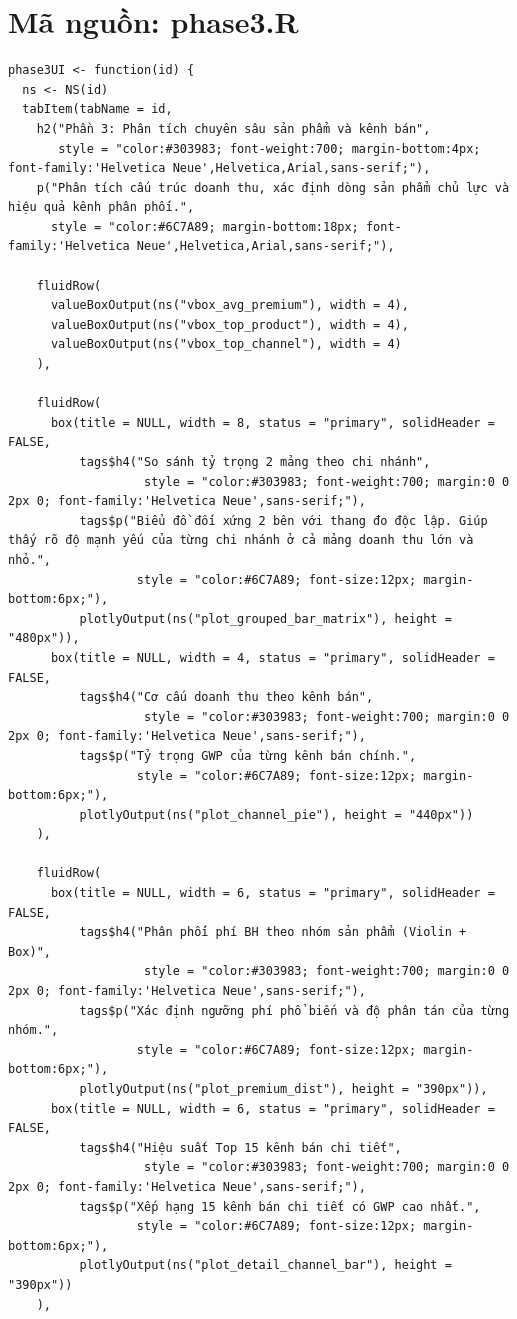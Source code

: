 \documentclass[12pt, a4paper]{article}
\begin{document}
\section{Mã nguồn: phase3.R}
\begin{lstlisting}
phase3UI <- function(id) {
  ns <- NS(id)
  tabItem(tabName = id,
    h2("Phần 3: Phân tích chuyên sâu sản phẩm và kênh bán",
       style = "color:#303983; font-weight:700; margin-bottom:4px; font-family:'Helvetica Neue',Helvetica,Arial,sans-serif;"),
    p("Phân tích cấu trúc doanh thu, xác định dòng sản phẩm chủ lực và hiệu quả kênh phân phối.",
      style = "color:#6C7A89; margin-bottom:18px; font-family:'Helvetica Neue',Helvetica,Arial,sans-serif;"),

    fluidRow(
      valueBoxOutput(ns("vbox_avg_premium"), width = 4),
      valueBoxOutput(ns("vbox_top_product"), width = 4),
      valueBoxOutput(ns("vbox_top_channel"), width = 4)
    ),

    fluidRow(
      box(title = NULL, width = 8, status = "primary", solidHeader = FALSE,
          tags$h4("So sánh tỷ trọng 2 mảng theo chi nhánh",
                   style = "color:#303983; font-weight:700; margin:0 0 2px 0; font-family:'Helvetica Neue',sans-serif;"),
          tags$p("Biểu đồ đối xứng 2 bên với thang đo độc lập. Giúp thấy rõ độ mạnh yếu của từng chi nhánh ở cả mảng doanh thu lớn và nhỏ.",
                  style = "color:#6C7A89; font-size:12px; margin-bottom:6px;"),
          plotlyOutput(ns("plot_grouped_bar_matrix"), height = "480px")),
      box(title = NULL, width = 4, status = "primary", solidHeader = FALSE,
          tags$h4("Cơ cấu doanh thu theo kênh bán",
                   style = "color:#303983; font-weight:700; margin:0 0 2px 0; font-family:'Helvetica Neue',sans-serif;"),
          tags$p("Tỷ trọng GWP của từng kênh bán chính.",
                  style = "color:#6C7A89; font-size:12px; margin-bottom:6px;"),
          plotlyOutput(ns("plot_channel_pie"), height = "440px"))
    ),

    fluidRow(
      box(title = NULL, width = 6, status = "primary", solidHeader = FALSE,
          tags$h4("Phân phối phí BH theo nhóm sản phẩm (Violin + Box)",
                   style = "color:#303983; font-weight:700; margin:0 0 2px 0; font-family:'Helvetica Neue',sans-serif;"),
          tags$p("Xác định ngưỡng phí phổ biến và độ phân tán của từng nhóm.",
                  style = "color:#6C7A89; font-size:12px; margin-bottom:6px;"),
          plotlyOutput(ns("plot_premium_dist"), height = "390px")),
      box(title = NULL, width = 6, status = "primary", solidHeader = FALSE,
          tags$h4("Hiệu suất Top 15 kênh bán chi tiết",
                   style = "color:#303983; font-weight:700; margin:0 0 2px 0; font-family:'Helvetica Neue',sans-serif;"),
          tags$p("Xếp hạng 15 kênh bán chi tiết có GWP cao nhất.",
                  style = "color:#6C7A89; font-size:12px; margin-bottom:6px;"),
          plotlyOutput(ns("plot_detail_channel_bar"), height = "390px"))
    ),


\end{lstlisting}
\end{document}
